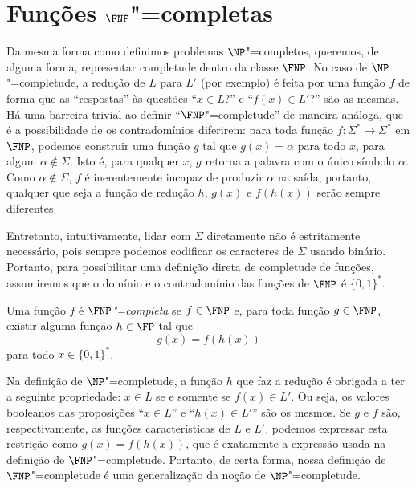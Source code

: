 \section{Funções $\FNP$"=completas}

Da mesma forma como definimos problemas $\NP$"=completos,
queremos, de alguma forma,
representar completude dentro da classe $\FNP$.
No caso de $\NP$"=completude,
a redução de $L$ para $L'$ (por exemplo)
é feita por uma função $f$ de forma que
as ``respostas'' às questões ``$x \in L$?'' e ``$f(x) \in L'$?'' são as mesmas.
Há uma barreira trivial ao definir ``$\FNP$"=completude'' de maneira análoga,
que é a possibilidade de os contradomínios diferirem:
para toda função $f: \Sigma^* \to \Sigma^*$ em $\FNP$,
podemos construir uma função $g$ tal que $g(x) = \alpha$ para todo $x$,
para algum $\alpha \notin \Sigma$.
Isto é, para qualquer $x$, $g$ retorna a palavra com o único símbolo $\alpha$.
Como $\alpha \notin \Sigma$,
$f$ é inerentemente incapaz de produzir $\alpha$ na saída;
portanto, qualquer que seja a função de redução $h$,
$g(x)$ e $f(h(x))$ serão sempre diferentes.

Entretanto, intuitivamente,
lidar com $\Sigma$ diretamente não é estritamente necessário,
pois sempre podemos codificar os caracteres de $\Sigma$ usando binário.
Portanto,
para possibilitar uma definição direta de completude de funções,
assumiremos que o domínio e o contradomínio das funções de $\FNP$
é $\{0, 1\}^*$.

\begin{definition}
    Uma função $f$ é \emph{$\FNP$"=completa}
    se $f \in \FNP$ e,
    para toda função $g \in \FNP$,
    existir alguma função $h \in \FP$ tal que
    \begin{equation*}
        g(x) = f(h(x))
    \end{equation*}
    para todo $x \in \{0, 1\}^*$.
\end{definition}

Na definição de $\NP$"=completude,
a função $h$ que faz a redução é obrigada a ter a seguinte propriedade:
$x \in L$ se e somente se $f(x) \in L'$.
Ou seja, os valores booleanos das proposições
``$x \in L$'' e ``$h(x) \in L'$'' são os mesmos.
Se $g$ e $f$ são, respectivamente,
as funções características de $L$ e $L'$,
podemos expressar esta restrição como
$g(x) = f(h(x))$,
que é exatamente a expressão usada na definição de $\FNP$"=completude.
Portanto, de certa forma,
nossa definição de $\FNP$"=completude
é uma generalização da noção de $\NP$"=completude.

